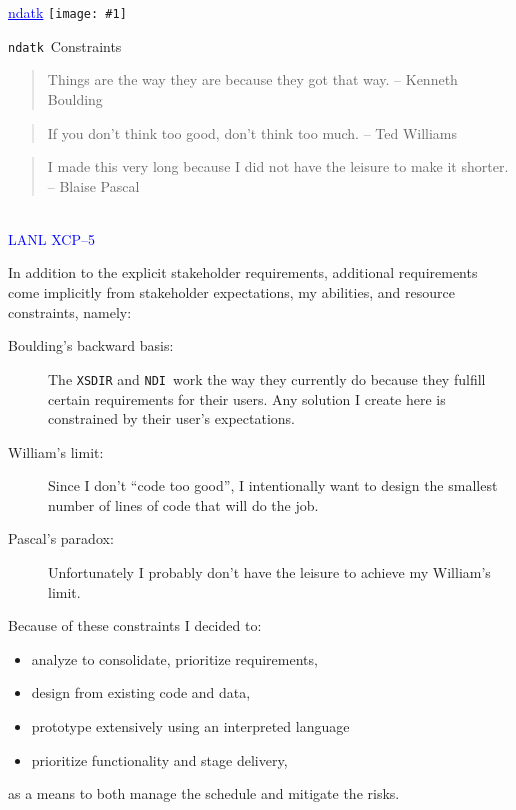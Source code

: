 \documentclass[clock]{slides}
\newenvironment{xslide}[1][logo.jpg]{\begin{slide} \tiny
\textcolor{blue}{\underline{ndatk}} \hfill
\texttt{[image: \#1]}
\normalsize}{\vfill\tiny
\textcolor{blue}{\hrulefill \\LANL XCP--5}
\end{slide}}
\newcommand{\ndatk}{\texttt{ndatk}}
\newcommand{\NDI}{\texttt{NDI}}
\begin{document}
\begin{xslide}
\begin{center}\Large
\ndatk\ Constraints
\end{center}

\begin{quote}
Things are the way they are because they got that way.
\flushright -- Kenneth Boulding
\end{quote}
\begin{quote}
If you don't think too good, don't think too much.
\flushright -- Ted Williams
\end{quote}
\begin{quote}
I made this very long because I did not have the leisure to make it
shorter.
\flushright -- Blaise Pascal
\end{quote}
\end{xslide}

\begin{note}\small

In addition to the explicit stakeholder requirements, additional
requirements come implicitly from stakeholder expectations, my
abilities, and resource constraints, namely:
\begin{description}
\item[Boulding's backward basis: ] The \texttt{XSDIR} and \NDI\ work
  the way they currently do because they fulfill certain requirements
  for their users.  Any solution I create here is constrained by their
  user's expectations.
\item[William's limit: ] Since I don't ``code too good'', I
  intentionally want to design the smallest number of lines of code
  that will do the job.
\item[Pascal's paradox: ] Unfortunately I probably don't have the
  leisure to achieve my William's limit.
\end{description}

Because of these constraints I decided to:
\begin{itemize}
\item analyze to consolidate, prioritize requirements,
\item design from existing code and data,
\item prototype extensively using an interpreted language
\item prioritize functionality and stage delivery,
\end{itemize}
as a means to both manage the schedule and mitigate the risks.

\end{note}
\end{document}
